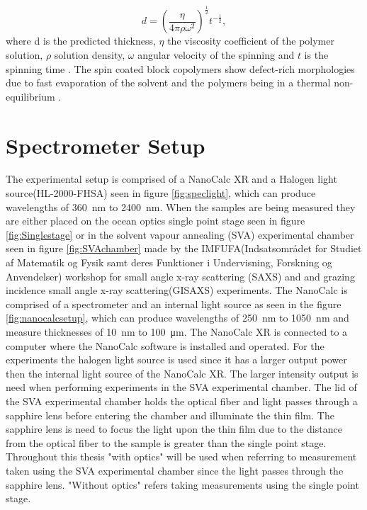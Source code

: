 \documentclass[MasterThesisMain.tex]{subfiles}
\begin{document}
\begin{equation}
d = \left(\frac{\eta}{4\pi\rho\omega^2}\right)^{\frac{1}{2}} t^{-\frac{1}{2}},
\end{equation}  
where d is the predicted thickness, $\eta$ the viscosity coefficient of the polymer solution, $\rho$ solution density, $\omega$ angular velocity of the spinning and $t$ is the spinning time \cite{petty2008molecular}. The spin coated block copolymers show defect-rich morphologies due to fast evaporation of the solvent and the polymers being in a thermal non-equilibrium \cite{PosseltBCP}.

\section{Spectrometer Setup}
The experimental setup is comprised of a NanoCalc XR and a Halogen light source(HL-2000-FHSA) seen in figure \ref{fig:speclight}, which can produce wavelengths of \SI{360}{\nano\meter} to \SI{2400}{\nano\meter}. When the samples are being measured they are either placed on the ocean optics single point stage seen in figure \ref{fig:Singlestage} or in the solvent vapour annealing (SVA) experimental chamber seen in figure \ref{fig:SVAchamber} made by the IMFUFA(Indsatsområdet for Studiet af Matematik og Fysik samt deres Funktioner i Undervisning, Forskning og Anvendelser) workshop for small angle x-ray scattering (SAXS) and and grazing incidence small angle x-ray scattering(GISAXS) experiments. The NanoCalc is comprised of a spectrometer and an internal light source as seen in the figure \ref{fig:nanocalcsetup}, which can produce wavelengths of \SI{250}{\nano\meter} to \SI{1050}{\nano\meter} and measure thicknesses of \SI{10}{\nano\meter} to \SI{100}{\micro\meter}. The NanoCalc XR is connected to a computer where the NanoCalc software is installed and operated. For the experiments the halogen light source is used since it has a larger output power then the internal light source of the NanoCalc XR. The larger intensity output is need when performing experiments in the SVA experimental chamber. The lid of the SVA experimental chamber holds the optical fiber and light passes through a sapphire lens before entering the chamber and illuminate the thin film. The sapphire lens is need to focus the light upon the thin film due to the distance from the optical fiber to the sample is greater than the single point stage. Throughout this thesis "with optics" will be used when referring to measurement taken using the SVA experimental chamber since the light passes through the sapphire lens. "Without optics" refers taking measurements using the single point stage.  
\end{document}
